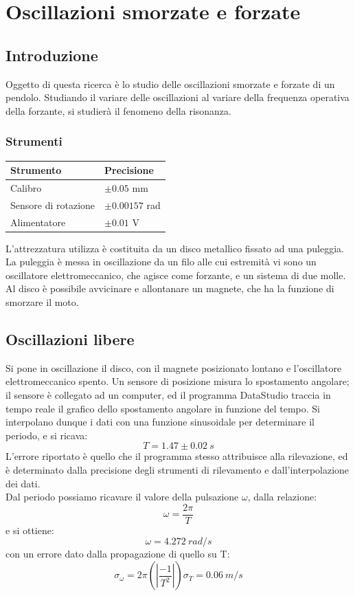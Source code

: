 
\chapter{Oscillazioni smorzate e forzate}


\section{Introduzione}

Oggetto di questa ricerca è lo studio delle oscillazioni smorzate e forzate di un pendolo. Studiando il variare delle oscillazioni al variare della frequenza operativa della forzante, si studierà il fenomeno della risonanza.

\subsection{Strumenti}
\begin{center}
\begin{tabular}{l|l}
Strumento & Precisione\\
\midrule
Calibro & $\pm 0.05$ mm\\ 
Sensore di rotazione & $\pm 0.00157$ rad\\ 
Alimentatore & $\pm 0.01$ V\\ 

\end{tabular}
\end{center}
L'attrezzatura utilizza è costituita da un disco metallico fissato ad una puleggia. La puleggia è messa in oscillazione da un filo alle cui estremità vi sono un oscillatore  elettromeccanico, che agisce come forzante, e un sistema di due molle. Al disco è possibile avvicinare e allontanare un magnete, che ha la funzione di smorzare il moto.

\section{Oscillazioni libere}

Si pone in oscillazione il disco, con il magnete  posizionato lontano e l'oscillatore elettromeccanico spento. Un sensore di posizione misura lo spostamento angolare; il sensore è collegato ad un computer, ed il programma DataStudio traccia in tempo reale il grafico dello spostamento angolare in funzione del tempo. Si interpolano dunque i dati con una funzione sinusoidale per determinare il periodo, e si ricava: $$T=1.47\pm0.02\ s$$ L'errore riportato è quello che il programma stesso attribuisce alla rilevazione, ed è determinato dalla precisione degli strumenti di rilevamento e dall'interpolazione dei dati.\\
Dal periodo possiamo ricavare il valore della pulsazione $\omega$, dalla relazione:
\begin{equation}\label{omepe}
\omega=\frac{2\pi}{T}
\end{equation}
e si ottiene:
$$\omega=4.272\ rad/s$$
con un errore dato dalla propagazione di quello su T:
$$\sigma_{\omega}=2\pi\left(|\frac{-1}{T^2}|\right)\sigma_T=0.06\ m/s$$
